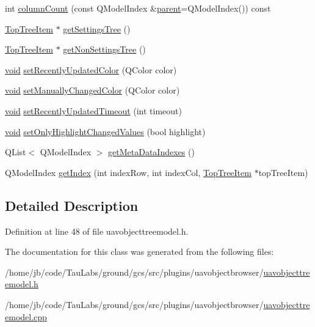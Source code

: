 \begin{DoxyCompactItemize}
\item 
int \hyperlink{group___u_a_v_object_browser_plugin_gafe7737e489b53e92c325a27785e690cd}{column\-Count} (const \-Q\-Model\-Index \&\hyperlink{group___u_a_v_object_browser_plugin_ga8d23a2cd6d6b785179ebd12426f142e3}{parent}=\-Q\-Model\-Index()) const 
\item 
\hyperlink{class_top_tree_item}{\-Top\-Tree\-Item} $\ast$ \hyperlink{group___u_a_v_object_browser_plugin_ga65564af37704d64b262417b4e5795b76}{get\-Settings\-Tree} ()
\item 
\hyperlink{class_top_tree_item}{\-Top\-Tree\-Item} $\ast$ \hyperlink{group___u_a_v_object_browser_plugin_gaba7711ed458572937f031011b8ad9842}{get\-Non\-Settings\-Tree} ()
\item 
\hyperlink{group___u_a_v_objects_plugin_ga444cf2ff3f0ecbe028adce838d373f5c}{void} \hyperlink{group___u_a_v_object_browser_plugin_gac3ae57e6538de964006edcdb0affb776}{set\-Recently\-Updated\-Color} (\-Q\-Color color)
\item 
\hyperlink{group___u_a_v_objects_plugin_ga444cf2ff3f0ecbe028adce838d373f5c}{void} \hyperlink{group___u_a_v_object_browser_plugin_ga9bc5e49ee3b742c3f1b9ff05b71f7d7e}{set\-Manually\-Changed\-Color} (\-Q\-Color color)
\item 
\hyperlink{group___u_a_v_objects_plugin_ga444cf2ff3f0ecbe028adce838d373f5c}{void} \hyperlink{group___u_a_v_object_browser_plugin_ga2b730043ef2a9acc337b2a6864894456}{set\-Recently\-Updated\-Timeout} (int timeout)
\item 
\hyperlink{group___u_a_v_objects_plugin_ga444cf2ff3f0ecbe028adce838d373f5c}{void} \hyperlink{group___u_a_v_object_browser_plugin_gaef0cd94aa30b16dabefb791a32542b10}{set\-Only\-Highlight\-Changed\-Values} (bool highlight)
\item 
\-Q\-List$<$ \-Q\-Model\-Index $>$ \hyperlink{group___u_a_v_object_browser_plugin_ga96556d7a4724a18462706ac54d6cc761}{get\-Meta\-Data\-Indexes} ()
\item 
\-Q\-Model\-Index \hyperlink{group___u_a_v_object_browser_plugin_gaadbcc539338a28f21acc570915b786df}{get\-Index} (int index\-Row, int index\-Col, \hyperlink{class_top_tree_item}{\-Top\-Tree\-Item} $\ast$top\-Tree\-Item)
\end{DoxyCompactItemize}


\subsection{\-Detailed \-Description}


\-Definition at line 48 of file uavobjecttreemodel.\-h.



\-The documentation for this class was generated from the following files\-:\begin{DoxyCompactItemize}
\item 
/home/jb/code/\-Tau\-Labs/ground/gcs/src/plugins/uavobjectbrowser/\hyperlink{uavobjecttreemodel_8h}{uavobjecttreemodel.\-h}\item 
/home/jb/code/\-Tau\-Labs/ground/gcs/src/plugins/uavobjectbrowser/\hyperlink{uavobjecttreemodel_8cpp}{uavobjecttreemodel.\-cpp}\end{DoxyCompactItemize}
